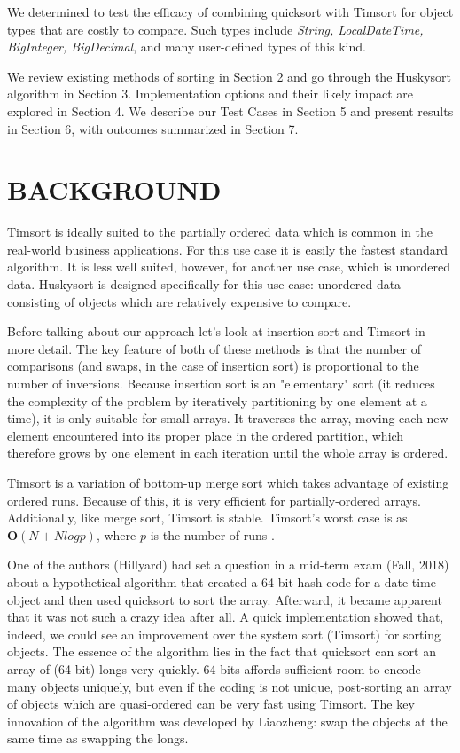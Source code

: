 \documentclass[acmtog]{acmart}
\begin{document}
We determined to test the efficacy of combining quicksort with Timsort for object types that are costly to compare.
Such types include \emph{String, LocalDateTime, BigInteger, BigDecimal}, and many user-defined types of this kind.

We review existing methods of sorting in Section 2 and go through the Huskysort algorithm in Section 3.
Implementation options and their likely impact are explored in Section 4.
We describe our Test Cases in Section 5 and present results in Section 6, with outcomes summarized in Section 7.


\section{BACKGROUND}
Timsort is ideally suited to the partially ordered data which is common in the real-world business applications.
For this use case it is easily the fastest standard algorithm.
It is less well suited, however, for another use case, which is unordered data.
Huskysort is designed specifically for this use case: unordered data consisting of objects which are relatively expensive to compare.

Before talking about our approach let's look at insertion sort and Timsort in more detail.
The key feature of both of these methods is that the number of comparisons (and swaps, in the case of insertion sort) is proportional to the number of inversions.
Because insertion sort is an "elementary" sort (it reduces the complexity of the problem by iteratively partitioning by one element at a time), it is only suitable for small arrays.
It traverses the array, moving each new element encountered into its proper place in the ordered partition, which therefore grows by one element in each iteration until the whole array is ordered.

Timsort is a variation of bottom-up merge sort which takes advantage of existing ordered runs.
Because of this, it is very efficient for partially-ordered arrays.
Additionally, like merge sort, Timsort is stable.
Timsort's worst case is as $\textbf{O}(N + N log p)$, where $p$ is the number of runs \cite{DBLP:journals/corr/abs-1805-08612}.

One of the authors (Hillyard) had set a question in a mid-term exam (Fall, 2018) about a hypothetical algorithm that created a 64-bit hash code for a date-time object and then used quicksort to sort the array.
Afterward, it became apparent that it was not such a crazy idea after all.
A quick implementation showed that, indeed, we could see an improvement over the system sort (Timsort) for sorting objects.
The essence of the algorithm lies in the fact that quicksort can sort an array of (64-bit) longs very quickly.
64 bits affords sufficient room to encode many objects uniquely, but even if the coding is not unique, post-sorting an array of objects which are quasi-ordered can be very fast using Timsort.
The key innovation of the algorithm was developed by Liaozheng: swap the objects at the same time as swapping the longs.
\end{document}
